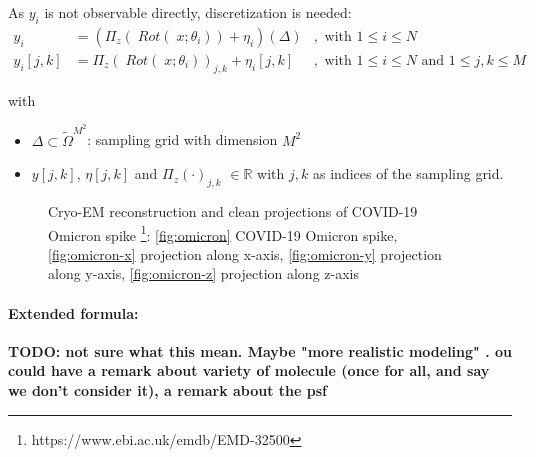 As $y_i$ is not observable directly, discretization is needed:
\begin{equation}
    \label{eq:cryoEmSimpleDiscrete}
    \begin{aligned}
        y_i &= \left( \Pi_z (\; Rot (\;x; \theta_i)) + \eta_i\right)(\Delta) &, \text{ with } 1 \leq i \leq N \\
        y_i[j,k] &= \Pi_z (\; Rot(\;x; \theta_i))_{j,k} + \eta_i[j,k] &, \text{ with } 1 \leq i \leq N \text{ and } 1 \leq j,k \leq M
    \end{aligned}
\end{equation}

with
\begin{itemize}
    \item $\Delta \subset \tilde{\Omega}^{M^2}$: sampling grid with dimension $M^2$
    \item $y[j,k]$, $\eta[j,k]$ and $\Pi_z(\cdot)_{j,k}$ $ \in \mathbb{R}$ with $j,k$ as indices of the sampling grid.
\end{itemize}


\begin{figure}[H]
    \label{fig:cryo-em-omicron}
    \hfill
    \hfill
    \hfill
    \hfill
    \hfill
	\caption{Cryo-EM reconstruction and clean projections of COVID-19 Omicron spike \protect\footnote{https://www.ebi.ac.uk/emdb/EMD-32500}: 
    \ref{fig:omicron} COVID-19 Omicron spike,
    \ref{fig:omicron-x} projection along x-axis,
    \ref{fig:omicron-y} projection along y-axis,
    \ref{fig:omicron-z} projection along z-axis
    }
\end{figure}


\paragraph{Extended formula:} 
\textbf{TODO: not sure what this mean. 
Maybe "more realistic modeling" .
 ou could have a remark about variety of molecule (once for all, and say we don't consider it), a remark about the psf 
 }


